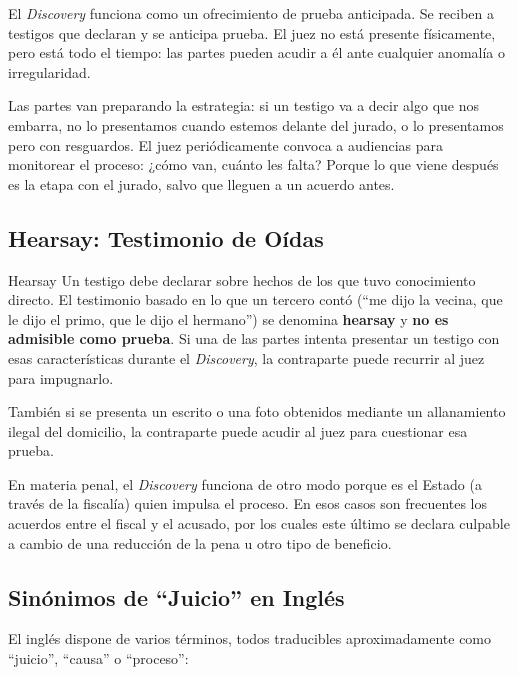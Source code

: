 \documentclass[12pt,oneside]{book}
\begin{document}
El \textit{Discovery} funciona como un ofrecimiento de prueba anticipada. Se reciben a testigos que declaran y se anticipa prueba. El juez no está presente físicamente, pero está todo el tiempo: las partes pueden acudir a él ante cualquier anomalía o irregularidad.

Las partes van preparando la estrategia: si un testigo va a decir algo que nos embarra, no lo presentamos cuando estemos delante del jurado, o lo presentamos pero con resguardos. El juez periódicamente convoca a audiencias para monitorear el proceso: ¿cómo van, cuánto les falta? Porque lo que viene después es la etapa con el jurado, salvo que lleguen a un acuerdo antes.

\subsection{Hearsay: Testimonio de Oídas}

\begin{definition}{Hearsay}
Un testigo debe declarar sobre hechos de los que tuvo conocimiento directo. El testimonio basado en lo que un tercero contó (``me dijo la vecina, que le dijo el primo, que le dijo el hermano'') se denomina \textbf{hearsay} y \textbf{no es admisible como prueba}. Si una de las partes intenta presentar un testigo con esas características durante el \textit{Discovery}, la contraparte puede recurrir al juez para impugnarlo.
\end{definition}

También si se presenta un escrito o una foto obtenidos mediante un allanamiento ilegal del domicilio, la contraparte puede acudir al juez para cuestionar esa prueba.

En materia penal, el \textit{Discovery} funciona de otro modo porque es el Estado (a través de la fiscalía) quien impulsa el proceso. En esos casos son frecuentes los acuerdos entre el fiscal y el acusado, por los cuales este último se declara culpable a cambio de una reducción de la pena u otro tipo de beneficio.

\subsection{Sinónimos de ``Juicio'' en Inglés}

El inglés dispone de varios términos, todos traducibles aproximadamente como ``juicio'', ``causa'' o ``proceso'':
\end{document}
